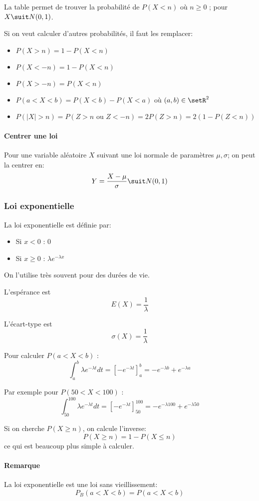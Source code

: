 \documentclass[10pt,a4paper,french]{article}
\begin{document}
La table permet de trouver la probabilité de $P(X < n)$ où $n \geq 0$ ; pour $X \suit N(0, 1)$.

Si on veut calculer d'autres probabilités, il faut les remplacer:
\begin{itemize}
\item $P(X > n) = 1 - P(X < n)$
\item $P(X < -n) = 1 - P(X < n)$
\item $P(X > -n) = P(X < n)$
\item $P(a < X < b) = P(X < b) - P(X < a)$ où $(a,b) \in \setR^2$
\item $P(\vert X \vert > n) = P(Z > n \text{ ou } Z < -n) = 2 P(Z > n) = 2 (1-P(Z < n))$
\end{itemize}

\paragraph{Centrer une loi}
Pour une variable aléatoire $X$ suivant une loi normale de paramètres $\mu, \sigma$; on peut la centrer en: 
\[Y = \frac{X - \mu}{\sigma} \suit N(0, 1)\]

\subsubsection{Loi exponentielle}

La loi exponentielle est définie par:
\begin{itemize}
\item Si $x < 0$ : 0
\item Si $x \geq 0$ : $\lambda e^{-\lambda x}$
\end{itemize}

On l'utilise très souvent pour des durées de vie.

L'espérance est \[E(X) = \frac{1}{\lambda}\]

L'écart-type est \[ \sigma(X) = \frac{1}{\lambda} \]

Pour calculer $P(a < X < b)$ : \[ \int_a^b \lambda e^{-\lambda t} dt = \left[ -e^{-\lambda t} \right]_a^b = -e^{-\lambda b} + e^{-\lambda a} \]

Par exemple pour $P(50 < X < 100)$ : \[ \int_{50}^{100} \lambda e^{-\lambda t} dt = \left[ -e^{-\lambda t} \right]_{50}^{100} = -e^{-\lambda 100} + e^{-\lambda 50} \]

Si on cherche $P(X \geq n)$, on calcule l'inverse: \[ P(X \geq n) = 1 - P(X \leq n) \] ce qui est beaucoup plus simple à calculer.

\paragraph{Remarque}
La loi exponentielle est une loi sans vieillissement: \[ P_B(a < X < b) = P(a < X < b) \]
\end{document}

